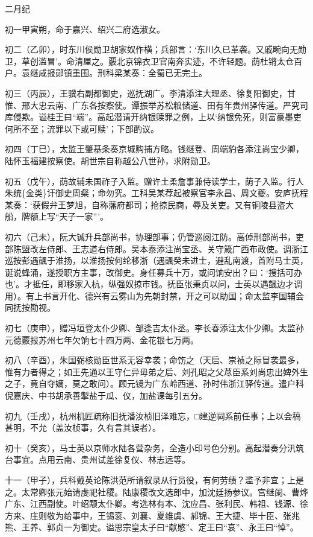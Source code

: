 \documentclass[]{article}
\begin{document}
二月纪

初一甲寅朔，命于嘉兴、绍兴二府选淑女。

初二（乙卯），时东川侯勋卫胡家奴作横；兵部言：`东川久已革袭。又戚畹向无勋卫，草创滥冒'。命清厘之。覈北京锦衣卫官南奔实迹，不许轻题。荫杜锵太仓百户。袁继咸报郧镇重围。刑科梁某奏：全蜀已无完土。

初三（丙辰），王骥右副都御史，巡抚湖广。李清添注大理丞、徐复阳御史，甘惟、邢大忠云南、广东各按察使。谭振举苏松粮储道、田有年贵州驿传道。严究司库侵欺。谥桂王曰``端''。高起潜请开纳银赎罪之例，上以`纳银免死，则富豪墨吏何所不至；流罪以下或可赎'；下部酌议。

初四（丁巳），太监王肇基条奏京城购捕方略。钱继登、周端豹各添注尚宝少卿，陆怀玉福建按察使。胡世宗自称越公八世孙，求附勋卫。

初五（戊午），荫故辅未国祚子入监。赠许土柔詹事兼侍读学士，荫子入监。行人朱统\{金类\}讦御史周粲；命勿究。工科吴某荐起被察官李永昌、周文夔。安庐抚程某奏：`获假弁王梦旭，自称藩府都司；抢掠民商，辱及关吏。又有铜陵县盗大船，牌额上写``天子一家'''。

初六（己未），阮大铖升兵部尚书，协理部事；仍管巡阅江防。高倬刑部尚书，吏部陈盟改左侍郎、王志道右侍郎。吴本泰添注尚宝丞、关守箴广西布政使。调浙江巡按彭遇颽于淮扬，以淮扬按何纶移浙（遇颽癸未进士，避乱南渡，首附马士英，诞说蜂涌，遂授职方主事，改御史。身任募兵十万，或问饷安出？曰：`搜括可办也'。才抵任，即移家入杭，纵强奴掠市钱。抚臣张秉贞以问，士英以遇颽边才调用）。有上书言开化、德兴有云雾山为先朝封禁，开之可以助国；命太监李国辅会同抚按勘视。

初七（庚申），赠冯垣登太仆少卿、邹逢吉太仆丞。李长春添注太仆少卿。太监孙元德覈报苏州七年欠饷七十四万两、金花银七万两。

初八（辛酉），朱国弼核勋臣世系无容幸袭；命饬之（天启、崇祯之际冒袭最多，惟有力者得之；如王先通以王守仁异毋弟之后、刘孔昭之父荩臣系刘尚忠出婢外生之子，竟自夺嫡，莫之敢问）。顾元镜为广东岭西道、孙时伟浙江驿传道。遣户科倪嘉庆、中书胡承善掣盐于瓜、仪，加盐课每引五分。

初九（壬戌），杭州机匠疏称旧抚潘汝桢旧泽难忘，□建逆祠系前任事；上以会稿甚明，不允（盖汝桢事，久有言其误者）。

初十（癸亥），马士英以京师水陆各营杂务，全造小印号色分别。高起潜奏分汛筑台事宜。点用云南、贵州试差徐复仪、林志远等。

十一（甲子），兵科戴英论陈洪范所请叙录从行员役，有何劳绩？滥予非宜；上是之。太常卿张元始请虔祀社稷。陆康稷改文选郎中，加沈廷扬参议。宫继阑、曹烨广东、江西副使。叶绍颙太仆卿。考选林有本、沈应昌、张利民、韩祖、钱源、徐方来、庄则敬为给事中，王锡衮、刘襄、夏维虞、郝锦、王大捷、毕十臣、张兆熊、王养、郭贞一为御史。谥思宗皇太子曰``献愍''、定王曰``哀''、永王曰``悼''。
\end{document}
